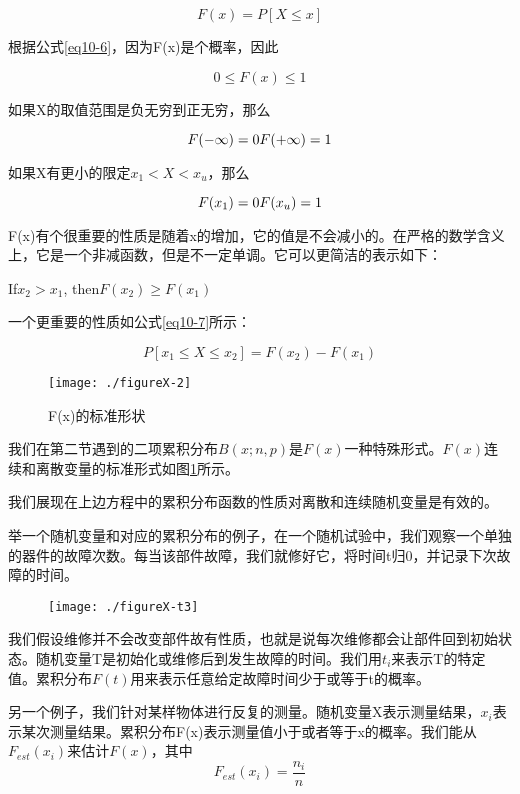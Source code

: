 \documentclass[cn,11pt,chinese]{elegantbook}
\begin{document}
{\begin{equation}\label{eq10-6}
F(x)=P[X \leq x] 
\end{equation}

根据公式\ref{eq10-6}，因为F(x)是个概率，因此

$$0\leq F(x) \leq 1 $$

如果X的取值范围是负无穷到正无穷，那么

$$
F(-\infty) =0 \\
F(+\infty) =1   \\
$$

如果X有更小的限定$x_1 <X <x_u$，那么

$$
F(x_1)=0    \\
F(x_u)=1
$$

F(x)有个很重要的性质是随着x的增加，它的值是不会减小的。在严格的数学含义上，它是一个非减函数，但是不一定单调。它可以更简洁的表示如下：

If$x_2>x_1$, then$F(x_2)\geq F(x_1)$

一个更重要的性质如公式\ref{eq10-7}所示：

\begin{equation}\label{eq10-7}
P[x_1 \leq X \leq x_2]=F(x_2)-F(x_1)
\end{equation}

\begin{figure}[H]
	\centering
	\texttt{[image: ./figureX-2]}
	\caption{F(x)的标准形状}\label{fig10-2}
\end{figure}

我们在第二节遇到的二项累积分布$B(x;n,p)$是$F(x)$一种特殊形式。$F(x)$连续和离散变量的标准形式如图\ref{fig10-2}所示。

我们展现在上边方程中的累积分布函数的性质对离散和连续随机变量是有效的。

举一个随机变量和对应的累积分布的例子，在一个随机试验中，我们观察一个单独的器件的故障次数。每当该部件故障，我们就修好它，将时间t归0，并记录下次故障的时间。

\begin{figure}[H]
	\texttt{[image: ./figureX-t3]}
\end{figure}


我们假设维修并不会改变部件故有性质，也就是说每次维修都会让部件回到初始状态。随机变量T是初始化或维修后到发生故障的时间。我们用$t_i$来表示T的特定值。累积分布$F(t)$用来表示任意给定故障时间少于或等于t的概率。

另一个例子，我们针对某样物体进行反复的测量。随机变量X表示测量结果，$x_i$表示某次测量结果。累积分布F(x)表示测量值小于或者等于x的概率。我们能从$F_{est}(x_i)$来估计$F(x)$，其中
$$
F_{est}(x_i)=\frac{n_i}{n}$$

}
\end{document}
